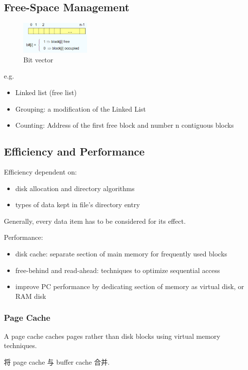 \subsection{Free-Space Management}
\begin{figure}[!htb]
    \centering
    \includegraphics[width=0.309\textwidth]{pic/Os11/Bit vector}
    \caption{Bit vector}
\end{figure}

e.g. %

\begin{itemize}
    \item Linked list (free list) 
    \item Grouping: a modification of the Linked List
    \item Counting: Address of the first free block and number n contiguous blocks
\end{itemize}

\subsection{Efficiency and Performance}
Efficiency dependent on:
\begin{itemize}
    \item disk allocation and directory algorithms
    \item types of data kept in file's directory entry
\end{itemize}
Generally, every data item has to be considered for its effect. 


Performance:
\begin{itemize}
    \item disk cache: separate section of main memory for frequently
    used blocks
    \item free-behind and read-ahead: techniques to optimize
    sequential access
    \item improve PC performance by dedicating section of memory as
    virtual disk, or RAM disk
\end{itemize}


\subsubsection{Page Cache}
A page cache caches pages rather than disk blocks using virtual
memory techniques. 

将 page cache 与 buffer cache 合并. 
